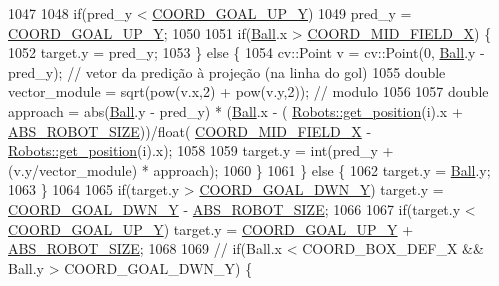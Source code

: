 \begin{DoxyCode}
1047 
1048                 \textcolor{keywordflow}{if}(pred\_y < \hyperlink{namespace_c_o_n_s_t_ab1e77f62ff88d04c9aac407f4405add2}{COORD\_GOAL\_UP\_Y})
1049                     pred\_y = \hyperlink{namespace_c_o_n_s_t_ab1e77f62ff88d04c9aac407f4405add2}{COORD\_GOAL\_UP\_Y};
1050 
1051                 \textcolor{keywordflow}{if}(\hyperlink{class_strategy_abd16b6276e747f6cd99a19963ff5495b}{Ball}.x > \hyperlink{namespace_c_o_n_s_t_ad21da2e838c0a8da29db74cba008cf46}{COORD\_MID\_FIELD\_X}) \{
1052                     target.y = pred\_y;
1053                 \} \textcolor{keywordflow}{else} \{
1054                     cv::Point v = cv::Point(0, \hyperlink{class_strategy_abd16b6276e747f6cd99a19963ff5495b}{Ball}.y - pred\_y); \textcolor{comment}{// vetor da predição à projeção (na
       linha do gol)}
1055                     \textcolor{keywordtype}{double} vector\_module = sqrt(pow(v.x,2) + pow(v.y,2)); \textcolor{comment}{// modulo}
1056 
1057                     \textcolor{keywordtype}{double} approach = abs(\hyperlink{class_strategy_abd16b6276e747f6cd99a19963ff5495b}{Ball}.y - pred\_y) * (\hyperlink{class_strategy_abd16b6276e747f6cd99a19963ff5495b}{Ball}.x - (
      \hyperlink{class_robots_a1fca8f2f5070176faa6ba1efa2f1ff14}{Robots::get\_position}(i).x + \hyperlink{namespace_c_o_n_s_t_a8d0d7fe4341b9129cabd565ef16a0640}{ABS\_ROBOT\_SIZE}))/float(
      \hyperlink{namespace_c_o_n_s_t_ad21da2e838c0a8da29db74cba008cf46}{COORD\_MID\_FIELD\_X} - \hyperlink{class_robots_a1fca8f2f5070176faa6ba1efa2f1ff14}{Robots::get\_position}(i).x);
1058 
1059                     target.y = int(pred\_y + (v.y/vector\_module) * approach);
1060                 \}
1061             \} \textcolor{keywordflow}{else} \{
1062                 target.y = \hyperlink{class_strategy_abd16b6276e747f6cd99a19963ff5495b}{Ball}.y;
1063             \}
1064 
1065             \textcolor{keywordflow}{if}(target.y > \hyperlink{namespace_c_o_n_s_t_a97382a534273f1ca10b7cdf29fab9d0a}{COORD\_GOAL\_DWN\_Y}) target.y = 
      \hyperlink{namespace_c_o_n_s_t_a97382a534273f1ca10b7cdf29fab9d0a}{COORD\_GOAL\_DWN\_Y} - \hyperlink{namespace_c_o_n_s_t_a8d0d7fe4341b9129cabd565ef16a0640}{ABS\_ROBOT\_SIZE};
1066 
1067             \textcolor{keywordflow}{if}(target.y < \hyperlink{namespace_c_o_n_s_t_ab1e77f62ff88d04c9aac407f4405add2}{COORD\_GOAL\_UP\_Y}) target.y = 
      \hyperlink{namespace_c_o_n_s_t_ab1e77f62ff88d04c9aac407f4405add2}{COORD\_GOAL\_UP\_Y} + \hyperlink{namespace_c_o_n_s_t_a8d0d7fe4341b9129cabd565ef16a0640}{ABS\_ROBOT\_SIZE};
1068 
1069             \textcolor{comment}{// if(Ball.x < COORD\_BOX\_DEF\_X && Ball.y > COORD\_GOAL\_DWN\_Y) \{}

\end{DoxyCode}
